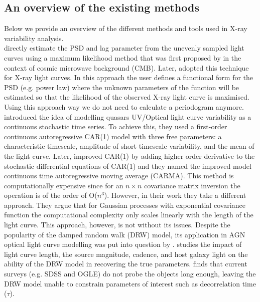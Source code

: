 \documentclass{aa}
\begin{document}
\subsection{An overview of the existing methods}
\label{sec:overview}
Below we provide an overview of the different methods and tools used in X-ray variability analysis. \\
\citet{Zoghbi2013} directly estimate the PSD and lag parameter from the unevenly sampled light curves using a maximum likelihood method that was first proposed by \citet{Bond1998} in the context of cosmic microwave background (CMB). Later, \citet{Miller2010} adopted this technique for X-ray light curves. In this approach the user defines a functional form for the PSD (e.g. power law) where the unknown parameters of the function will be estimated so that the likelihood of the observed X-ray light curve is maximised. Using this approach way we do not need to calculate a periodogram anymore. \\ 
\citet{Kelly2009} introduced the idea of modelling quasars UV/Optical light curve variability as a continuous stochastic time series. To achieve this, they used a first-order continuous autoregressive CAR(1) model with three free parameters: a characteristic timescale, amplitude of short timescale variability, and the mean of the light curve. Later, \citet{Kelly2014} improved CAR(1) by adding higher order derivative to the stochastic differential equations of CAR(1) and they named the improved model continuous time autoregressive moving average (CARMA). This method is computationally expensive since for an $n \times n $ covariance matrix inversion the operation is of the order of O($n^3$). However, in their work they take a different approach. They argue that for Gaussian processes with exponential covariance function the computational complexity only scales linearly with the length of the light curve. This approach, however, is not without its issues. Despite the popularity of the damped random walk (DRW) model, its application in AGN optical light curve modelling was put into question by \citet{Kozlowski2017}. \citet{Kozlowski2017} studies the impact of light curve length, the source magnitude, cadence, and host galaxy light on the ability of the DRW model in recovering the true parameters. \citet{Kozlowski2017} finds that current surveys (e.g. SDSS and OGLE) do not probe the objects long enough, leaving the DRW model unable to constrain parameters of interest such as decorrelation time ($\tau$). \\ 
\end{document}
